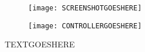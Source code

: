 \documentclass{beamer}
\begin{document}
\beamertemplatenavigationsymbolsempty
\begin{frame}
\begin{figure}
\begin{minipage}{0.6\textwidth}
    \texttt{[image: SCREENSHOTGOESHERE]}
\end{minipage}
\begin{minipage}{0.3\textwidth}
    \texttt{[image: CONTROLLERGOESHERE]}
\end{minipage}
\end{figure}
TEXTGOESHERE
\end{frame}
\end{document}
